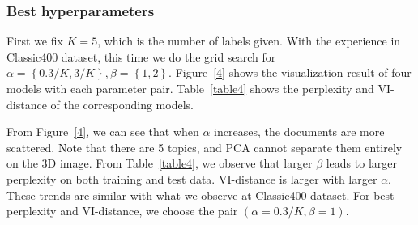 \documentclass{article} %
\begin{document}
\subsubsection{Best hyperparameters}
First we fix $K=5$, which is the number of labels given. With the experience in Classic400 dataset, this time we do the grid search for $\alpha = \left\{0.3/K, 3/K\right\}, \beta = \left\{1, 2\right\}$. Figure~\ref{4} shows the visualization result of four models with each parameter pair. Table~\ref{table4} shows the perplexity and VI-distance of the corresponding models. 
\par
From Figure~\ref{4}, we can see that when $\alpha$ increases, the documents are more scattered. Note that there are 5 topics, and PCA cannot separate them entirely on the 3D image. From Table~\ref{table4}, we observe that larger $\beta$ leads to larger perplexity on both training and test data. VI-distance is larger with larger $\alpha$. These trends are similar with what we observe at Classic400 dataset. For best perplexity and VI-distance, we choose the pair $(\alpha=0.3/K, \beta=1)$.
\end{document}
